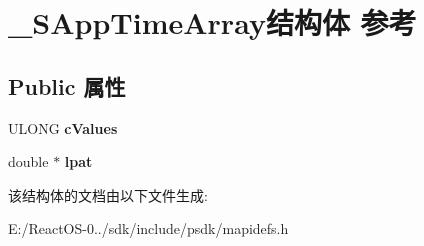 \hypertarget{struct___s_app_time_array}{}\section{\+\_\+\+S\+App\+Time\+Array结构体 参考}
\label{struct___s_app_time_array}
\subsection*{Public 属性}
\begin{DoxyCompactItemize}
\item 
\mbox{\label{struct___s_app_time_array_a29f384ea8293a26801b6a511ee5682ef}} 
U\+L\+O\+NG {\bfseries c\+Values}
\item 
\mbox{\label{struct___s_app_time_array_a5a27b9c9123f8262dc3ecc2f7bc6453e}} 
double $\ast$ {\bfseries lpat}
\end{DoxyCompactItemize}


该结构体的文档由以下文件生成\+:\begin{DoxyCompactItemize}
\item 
E\+:/\+React\+O\+S-\/0../sdk/include/psdk/mapidefs.\+h\end{DoxyCompactItemize}
